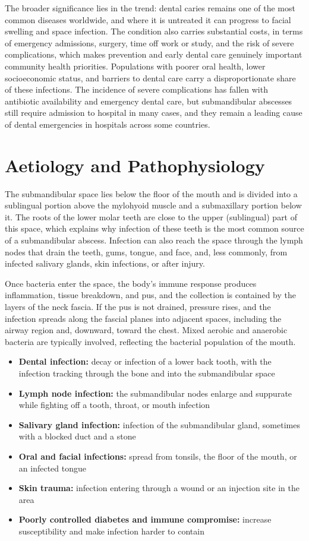 The broader significance lies in the trend: dental caries remains one of the most common diseases worldwide, and where it is untreated it can progress to facial swelling and space infection. The condition also carries substantial costs, in terms of emergency admissions, surgery, time off work or study, and the risk of severe complications, which makes prevention and early dental care genuinely important community health priorities. Populations with poorer oral health, lower socioeconomic status, and barriers to dental care carry a disproportionate share of these infections. The incidence of severe complications has fallen with antibiotic availability and emergency dental care, but submandibular abscesses still require admission to hospital in many cases, and they remain a leading cause of dental emergencies in hospitals across some countries.

\section*{Aetiology and Pathophysiology}
The submandibular space lies below the floor of the mouth and is divided into a sublingual portion above the mylohyoid muscle and a submaxillary portion below it. The roots of the lower molar teeth are close to the upper (sublingual) part of this space, which explains why infection of these teeth is the most common source of a submandibular abscess. Infection can also reach the space through the lymph nodes that drain the teeth, gums, tongue, and face, and, less commonly, from infected salivary glands, skin infections, or after injury.

Once bacteria enter the space, the body's immune response produces inflammation, tissue breakdown, and pus, and the collection is contained by the layers of the neck fascia. If the pus is not drained, pressure rises, and the infection spreads along the fascial planes into adjacent spaces, including the airway region and, downward, toward the chest. Mixed aerobic and anaerobic bacteria are typically involved, reflecting the bacterial population of the mouth.

\begin{itemize}
    \item \textbf{Dental infection:} decay or infection of a lower back tooth, with the infection tracking through the bone and into the submandibular space
    \item \textbf{Lymph node infection:} the submandibular nodes enlarge and suppurate while fighting off a tooth, throat, or mouth infection
    \item \textbf{Salivary gland infection:} infection of the submandibular gland, sometimes with a blocked duct and a stone
    \item \textbf{Oral and facial infections:} spread from tonsils, the floor of the mouth, or an infected tongue
    \item \textbf{Skin trauma:} infection entering through a wound or an injection site in the area
    \item \textbf{Poorly controlled diabetes and immune compromise:} increase susceptibility and make infection harder to contain
\end{itemize}

